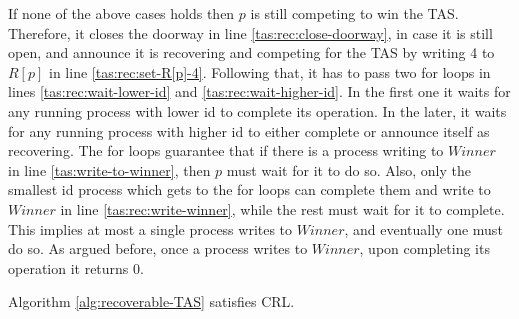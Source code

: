 If none of the above cases holds then $p$ is still competing to win the TAS. Therefore, it closes the doorway in line \ref{tas:rec:close-doorway}, in case it is still open, and announce it is recovering and competing for the TAS by writing 4 to $R[p]$ in line \ref{tas:rec:set-R[p]-4}. Following that, it has to pass two for loops in lines \ref{tas:rec:wait-lower-id} and \ref{tas:rec:wait-higher-id}. In the first one it waits for any running process with lower id to complete its operation. In the later, it waits for any running process with higher id to either complete or announce itself as recovering.
The for loops guarantee that if there is a process writing to $Winner$ in line \ref{tas:write-to-winner}, then $p$ must wait for it to do so. Also, only the smallest id process which gets to the for loops can complete them and write to $Winner$ in line \ref{tas:rec:write-winner}, while the rest must wait for it to complete. This implies at most a single process writes to $Winner$, and eventually one must do so. As argued before, once a process writes to $Winner$, upon completing its operation it returns 0.



\begin{claim}
	Algorithm \ref{alg:recoverable-TAS} satisfies CRL.
\end{claim}

